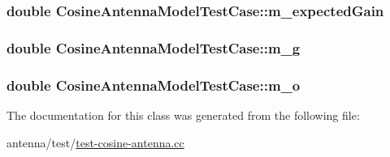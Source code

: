 \subsubsection[{\texorpdfstring{m\+\_\+expected\+Gain}{m_expectedGain}}]{\setlength{\rightskip}{0pt plus 5cm}double Cosine\+Antenna\+Model\+Test\+Case\+::m\+\_\+expected\+Gain\hspace{0.3cm}{\ttfamily [private]}}\hypertarget{classCosineAntennaModelTestCase_a1d2e6d618ec6ebb14fe322827ca37457}{}\label{classCosineAntennaModelTestCase_a1d2e6d618ec6ebb14fe322827ca37457}
\subsubsection[{\texorpdfstring{m\+\_\+g}{m_g}}]{\setlength{\rightskip}{0pt plus 5cm}double Cosine\+Antenna\+Model\+Test\+Case\+::m\+\_\+g\hspace{0.3cm}{\ttfamily [private]}}\hypertarget{classCosineAntennaModelTestCase_ad86c712d0fe6a2359cedd24bfdcce8cf}{}\label{classCosineAntennaModelTestCase_ad86c712d0fe6a2359cedd24bfdcce8cf}
\subsubsection[{\texorpdfstring{m\+\_\+o}{m_o}}]{\setlength{\rightskip}{0pt plus 5cm}double Cosine\+Antenna\+Model\+Test\+Case\+::m\+\_\+o\hspace{0.3cm}{\ttfamily [private]}}\hypertarget{classCosineAntennaModelTestCase_a98565b122b2d2b97efd4021119bf60af}{}\label{classCosineAntennaModelTestCase_a98565b122b2d2b97efd4021119bf60af}


The documentation for this class was generated from the following file\+:\begin{DoxyCompactItemize}
\item 
antenna/test/\hyperlink{test-cosine-antenna_8cc}{test-\/cosine-\/antenna.\+cc}\end{DoxyCompactItemize}
